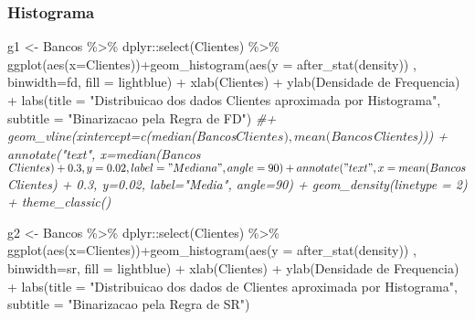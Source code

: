 \documentclass[
]{article}
\newenvironment{Shaded}{\begin{snugshade}}{\end{snugshade}}
\newcommand{\AttributeTok}[1]{\textcolor[rgb]{0.77,0.63,0.00}{#1}}
\newcommand{\CommentTok}[1]{\textcolor[rgb]{0.56,0.35,0.01}{\textit{#1}}}
\newcommand{\FunctionTok}[1]{\textcolor[rgb]{0.00,0.00,0.00}{#1}}
\newcommand{\NormalTok}[1]{#1}
\newcommand{\OtherTok}[1]{\textcolor[rgb]{0.56,0.35,0.01}{#1}}
\newcommand{\SpecialCharTok}[1]{\textcolor[rgb]{0.00,0.00,0.00}{#1}}
\newcommand{\StringTok}[1]{\textcolor[rgb]{0.31,0.60,0.02}{#1}}
\begin{document}
\hypertarget{histograma-3}{%
\subsubsection{Histograma}\label{histograma-3}}

\begin{Shaded}
\begin{Highlighting}[]
\NormalTok{g1 }\OtherTok{\textless{}{-}}\NormalTok{ Bancos }\SpecialCharTok{\%\textgreater{}\%}\NormalTok{ dplyr}\SpecialCharTok{::}\FunctionTok{select}\NormalTok{(Clientes) }\SpecialCharTok{\%\textgreater{}\%} \FunctionTok{ggplot}\NormalTok{(}\FunctionTok{aes}\NormalTok{(}\AttributeTok{x=}\NormalTok{Clientes))}\SpecialCharTok{+}\FunctionTok{geom\_histogram}\NormalTok{(}\FunctionTok{aes}\NormalTok{(}\AttributeTok{y =} \FunctionTok{after\_stat}\NormalTok{(density)) , }\AttributeTok{binwidth=}\NormalTok{fd, }\AttributeTok{fill =} \StringTok{\textquotesingle{}lightblue\textquotesingle{}}\NormalTok{) }\SpecialCharTok{+} \FunctionTok{xlab}\NormalTok{(}\StringTok{\textquotesingle{}Clientes\textquotesingle{}}\NormalTok{) }\SpecialCharTok{+} \FunctionTok{ylab}\NormalTok{(}\StringTok{\textquotesingle{}Densidade de Frequencia\textquotesingle{}}\NormalTok{) }\SpecialCharTok{+} \FunctionTok{labs}\NormalTok{(}\AttributeTok{title =} \StringTok{"Distribuicao dos dados Clientes aproximada por Histograma"}\NormalTok{, }\AttributeTok{subtitle =} \StringTok{"Binarizacao pela Regra de FD"}\NormalTok{)}
\CommentTok{\#+ geom\_vline(xintercept=c(median(Bancos$Clientes), mean(Bancos$Clientes))) + annotate("text", x=median(Bancos$Clientes) + 0.3, y=0.02, label="Mediana", angle=90) + annotate("text", x=mean(Bancos$Clientes) + 0.3, y=0.02, label="Media", angle=90) + geom\_density(linetype = 2) + theme\_classic()}


\NormalTok{g2 }\OtherTok{\textless{}{-}}\NormalTok{ Bancos }\SpecialCharTok{\%\textgreater{}\%}\NormalTok{ dplyr}\SpecialCharTok{::}\FunctionTok{select}\NormalTok{(Clientes) }\SpecialCharTok{\%\textgreater{}\%} \FunctionTok{ggplot}\NormalTok{(}\FunctionTok{aes}\NormalTok{(}\AttributeTok{x=}\NormalTok{Clientes))}\SpecialCharTok{+}\FunctionTok{geom\_histogram}\NormalTok{(}\FunctionTok{aes}\NormalTok{(}\AttributeTok{y =} \FunctionTok{after\_stat}\NormalTok{(density)) , }\AttributeTok{binwidth=}\NormalTok{sr, }\AttributeTok{fill =} \StringTok{\textquotesingle{}lightblue\textquotesingle{}}\NormalTok{) }\SpecialCharTok{+} \FunctionTok{xlab}\NormalTok{(}\StringTok{\textquotesingle{}Clientes\textquotesingle{}}\NormalTok{) }\SpecialCharTok{+} \FunctionTok{ylab}\NormalTok{(}\StringTok{\textquotesingle{}Densidade de Frequencia\textquotesingle{}}\NormalTok{) }\SpecialCharTok{+} \FunctionTok{labs}\NormalTok{(}\AttributeTok{title =} \StringTok{"Distribuicao dos dados de Clientes aproximada por Histograma"}\NormalTok{, }\AttributeTok{subtitle =} \StringTok{"Binarizacao pela Regra de SR"}\NormalTok{) }


\end{Highlighting}
\end{Shaded}
\end{document}
